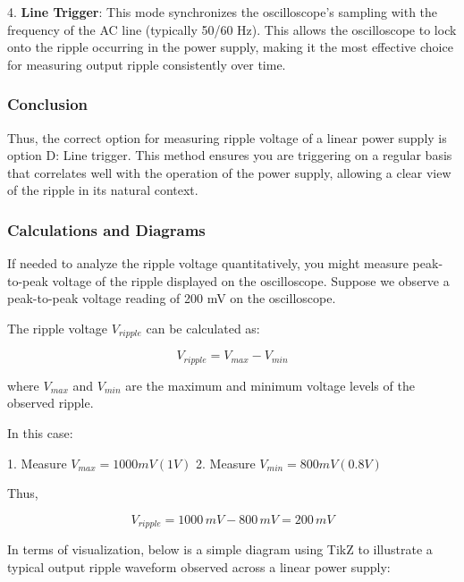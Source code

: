 4. \textbf{Line Trigger}: This mode synchronizes the oscilloscope's sampling with the frequency of the AC line (typically 50/60 Hz). This allows the oscilloscope to lock onto the ripple occurring in the power supply, making it the most effective choice for measuring output ripple consistently over time.

\subsubsection{Conclusion}

Thus, the correct option for measuring ripple voltage of a linear power supply is option D: Line trigger. This method ensures you are triggering on a regular basis that correlates well with the operation of the power supply, allowing a clear view of the ripple in its natural context.

\subsubsection{Calculations and Diagrams}

If needed to analyze the ripple voltage quantitatively, you might measure peak-to-peak voltage of the ripple displayed on the oscilloscope. Suppose we observe a peak-to-peak voltage reading of 200 mV on the oscilloscope. 

The ripple voltage \( V_{ripple} \) can be calculated as:

\[
V_{ripple} = V_{max} - V_{min}
\]

where \( V_{max} \) and \( V_{min} \) are the maximum and minimum voltage levels of the observed ripple.

In this case:

1. Measure \( V_{max} = 1000 mV (1V) \)
2. Measure \( V_{min} = 800 mV (0.8V) \)

Thus, 

\[
V_{ripple} = 1000 \, mV - 800 \, mV = 200 \, mV
\]

In terms of visualization, below is a simple diagram using TikZ to illustrate a typical output ripple waveform observed across a linear power supply:

